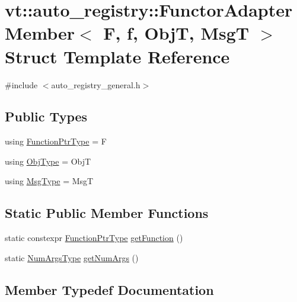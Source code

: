 \hypertarget{structvt_1_1auto__registry_1_1_functor_adapter_member}{}\section{vt\+:\+:auto\+\_\+registry\+:\+:Functor\+Adapter\+Member$<$ F, f, ObjT, MsgT $>$ Struct Template Reference}
\label{structvt_1_1auto__registry_1_1_functor_adapter_member}


{\ttfamily \#include $<$auto\+\_\+registry\+\_\+general.\+h$>$}

\subsection*{Public Types}
\begin{DoxyCompactItemize}
\item 
using \hyperlink{structvt_1_1auto__registry_1_1_functor_adapter_member_a024b0fba6787d70e73f21f171bd69f51}{Function\+Ptr\+Type} = F
\item 
using \hyperlink{structvt_1_1auto__registry_1_1_functor_adapter_member_a0a83596d25d5f460595b4b60b6943c73}{Obj\+Type} = ObjT
\item 
using \hyperlink{structvt_1_1auto__registry_1_1_functor_adapter_member_aac047547f57874f5b42e9cc3c8ea534f}{Msg\+Type} = MsgT
\end{DoxyCompactItemize}
\subsection*{Static Public Member Functions}
\begin{DoxyCompactItemize}
\item 
static constexpr \hyperlink{structvt_1_1auto__registry_1_1_functor_adapter_member_a024b0fba6787d70e73f21f171bd69f51}{Function\+Ptr\+Type} \hyperlink{structvt_1_1auto__registry_1_1_functor_adapter_member_a38bac2340fba8175700a58b5bf129126}{get\+Function} ()
\item 
static \hyperlink{namespacevt_1_1auto__registry_aebda1d9d765bc9147dc654ad0712c936}{Num\+Args\+Type} \hyperlink{structvt_1_1auto__registry_1_1_functor_adapter_member_aa91ec67a8621684f13d2ec4d85be9042}{get\+Num\+Args} ()
\end{DoxyCompactItemize}


\subsection{Member Typedef Documentation}
\mbox{\label{structvt_1_1auto__registry_1_1_functor_adapter_member_a024b0fba6787d70e73f21f171bd69f51}} 
